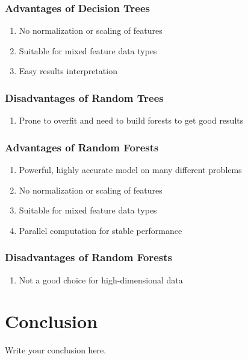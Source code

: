 \documentclass{article}
\begin{document}
\subsubsection{Advantages of Decision Trees}
\begin{enumerate}
	\item No normalization or scaling of features
	\item Suitable for mixed feature data types
	\item Easy results interpretation
\end{enumerate}

\subsubsection{Disadvantages of Random Trees}
\begin{enumerate}
\item Prone to overfit and need to build forests to get good results
\end{enumerate}

\subsubsection{Advantages of Random Forests}
\begin{enumerate}
	\item Powerful, highly accurate model on many different problems
	\item No normalization or scaling of features
	\item Suitable for mixed feature data types
	\item Parallel computation for stable performance
\end{enumerate}

\subsubsection{Disadvantages of Random Forests}
\begin{enumerate}
	\item Not a good choice for high-dimensional data
\end{enumerate}


\section{Conclusion}
Write your conclusion here.
\end{document}

